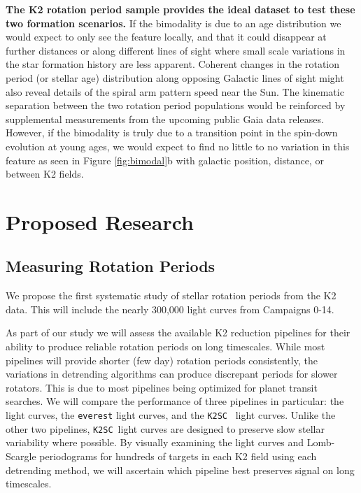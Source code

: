 \documentclass[12pt]{article}
\newcommand{\ktwosc}{{\tt K2SC}}
\begin{document}
{\bf The K2 rotation period sample provides the ideal dataset to test these two formation scenarios.} If the bimodality is due to an age distribution we would expect to only see the feature locally, and that it could disappear at further distances or along different lines of sight where small scale variations in the star formation history are less apparent. Coherent changes in the rotation period (or stellar age) distribution along opposing Galactic lines of sight might also reveal details of the spiral arm pattern speed near the Sun. The kinematic separation between the two rotation period populations would be reinforced by supplemental measurements from the upcoming public Gaia data releases. However, if the bimodality is truly due to a transition point in the spin-down evolution at young ages, we would expect to find no little to no variation in this feature as seen in Figure \ref{fig:bimodal}b with galactic position, distance, or between K2 fields.





\section{Proposed Research}
\subsection{Measuring Rotation Periods}
We propose the first systematic study of stellar rotation periods from the K2
data. This will include the nearly 300,000 light curves from Campaigns 0-14.


As part of our study we will assess the available K2 reduction pipelines for their ability to produce reliable rotation periods on long timescales. While most pipelines will provide shorter (few day) rotation periods consistently, the variations in detrending algorithms can produce discrepant periods for slower rotators. This is due to most pipelines being optimized for planet transit searches. We will compare the performance of three pipelines in particular: the
\citet{Vanderburg2015} light curves, the {\tt everest} \citet{luger2016} light
curves, and the \ktwosc\ \citet{aigrain2016} light curves. Unlike the other two pipelines, \ktwosc\ light curves are designed to preserve slow stellar variability where possible.
By visually examining the light curves and Lomb-Scargle periodograms for hundreds of targets in each K2 field using each detrending method, we will ascertain
which pipeline best preserves signal on long timescales. 
\end{document}
